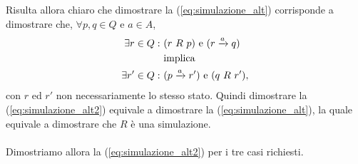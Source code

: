    Risulta allora chiaro che dimostrare la (\ref{eq:simulazione_alt}) corrisponde a dimostrare che, $\forall p,q\in Q$ e $a\in A$,
    \begin{align}
        \exists r\in Q:\ &(r\ R\ p)\ \mbox{e}\ (r \xrightarrow{a} q) \notag\\
        &\mbox{implica} \label{eq:simulazione_alt2}\\
        \exists r'\in Q:\ &(p \xrightarrow{a} r')\ \mbox{e}\ (q\ R\ r'), \notag
    \end{align}
    con $r$ ed $r'$ non necessariamente lo stesso stato. Quindi dimostrare la (\ref{eq:simulazione_alt2}) equivale a dimostrare la (\ref{eq:simulazione_alt}), la quale equivale a dimostrare che $R$ è una simulazione.\\
    \\
    Dimostriamo allora la (\ref{eq:simulazione_alt2}) per i tre casi richiesti.
    
